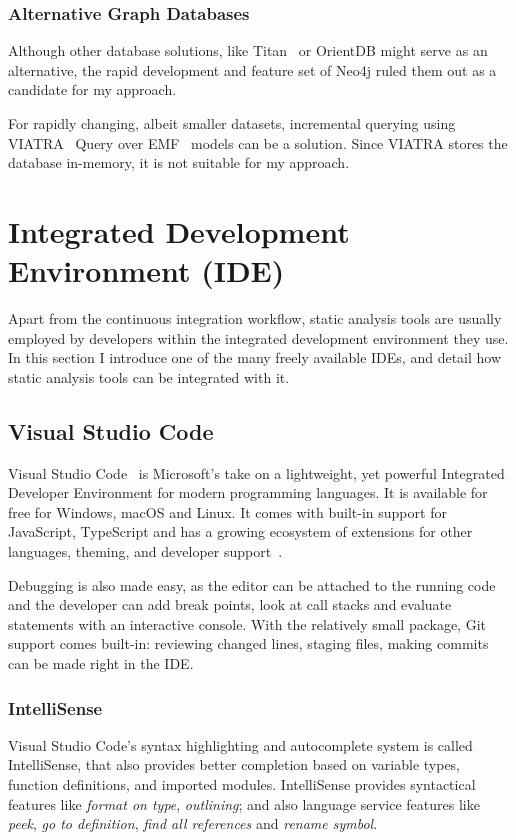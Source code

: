 \subsubsection{Alternative Graph Databases}
Although other database solutions, like Titan~\cite{titan} or OrientDB might serve as an alternative, the rapid development and feature set of Neo4j ruled them out as a candidate for my approach.

For rapidly changing, albeit smaller datasets, incremental querying using VIATRA~\cite{viatra} Query over EMF~\cite{EMF} models can be a solution. Since VIATRA stores the database in-memory, it is not suitable for my approach.


\section{Integrated Development Environment (IDE)}
\label{sect:IDE}
Apart from the continuous integration workflow, static analysis tools are usually employed by developers within the integrated development environment they use. In this section I introduce one of the many freely available IDEs, and detail how static analysis tools can be integrated with it.

\subsection{Visual Studio Code}
\label{sect:visual-studio-code}
Visual Studio Code~\cite{vscode} is Microsoft's take on a lightweight, yet powerful Integrated Developer Environment for modern programming languages. It is available for free for Windows, macOS and Linux. It comes with built-in support for JavaScript, TypeScript and has a growing ecosystem of extensions for other languages, theming, and developer support~\cite{vscode-extensions}.

Debugging is also made easy, as the editor can be attached to the running code and the developer can add break points, look at call stacks and evaluate statements with an interactive console. With the relatively small package, Git support comes built-in: reviewing changed lines, staging files, making commits can be made right in the IDE.

\subsubsection{IntelliSense}
Visual Studio Code's syntax highlighting and autocomplete system is called IntelliSense, that also provides better completion based on variable types, function definitions, and imported modules. IntelliSense provides syntactical features like \emph{format on type}, \emph{outlining}; and also language service features like \emph{peek}, \emph{go to definition}, \emph{find all references} and \emph{rename symbol}.

